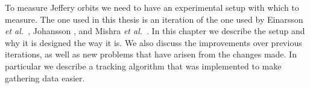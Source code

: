 To measure Jeffery orbits we need to have an experimental setup with which to measure. The one used in this thesis is an iteration of the one used by Einarsson \emph{et al.}~\cite{JonasExperiment}, Johansson \cite{AntonThesis}, and Mishra \emph{et al.}~\cite{Mishra}. In this chapter we describe the setup and why it is designed the way it is. We also discuss the improvements over previous iterations, as well as new problems that have arisen from the changes made. In particular we describe a tracking algorithm that was implemented to make gathering data easier.